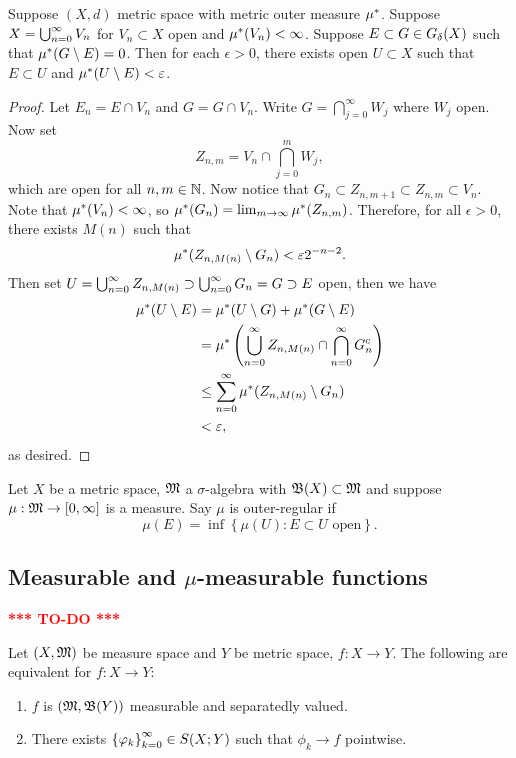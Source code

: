 \documentclass[a4paper]{article}
\begin{document}
\begin{lemma}
Suppose $(X, d)$ metric space with metric outer measure 
$\mu^*$. Suppose $X = \bigcup_{n=0}^\infty V_n$ for $V_n \subset X$ open and 
$\mu^*(V_n) < \infty$. Suppose $E \subset G \in G_\delta(X)$ such that 
$\mu^*(G \setminus E) = 0$. Then for each $\epsilon > 0$, 
there exists open $U \subset X$ such that $E \subset U$
and $\mu^*(U \setminus E) < \varepsilon$.  

\end{lemma}

\begin{proof}

Let $E_n = E \cap V_n$ and $G = G \cap V_n$. Write 
$G = \bigcap_{j=0}^\infty W_j$ where $W_j$ open. 
Now set 
\[
Z_{n, m} = V_n \cap \bigcap_{j=0}^m W_j,
\]
which are open for all $n, m \in \mathbb{N}$.
Now notice that $G_n \subset Z_{n, m+1} \subset Z_{n,m} 
\subset V_n$. Note that $\mu^*(V_n) < \infty$, so 
$\mu^*(G_n) = \lim_{m \to \infty} \mu^*(Z_{n, m})$. Therefore, 
for all $\epsilon > 0$, there exists $M(n)$ such that 
\[
\mu^*(Z_{n, M(n)} \setminus G_n) < \varepsilon 2^{-n-2}.
\]
Then set $U = \bigcup_{n=0}^\infty Z_{n, M(n)} \supset \bigcup_{n=0}^\infty G_n = G 
\supset E$ open, then we have 
\[
\begin{aligned}
\mu^*(U \setminus E) 
&= \mu^*(U \setminus G) + \mu^*(G \setminus E)  \\
&= \mu^* \left( \bigcup_{n=0}^\infty Z_{n, M(n)} \cap
\bigcap_{n=0}^\infty G_n^c \right) \\
&\leq \sum_{n=0}^\infty \mu^*(Z_{n, M(n)} \setminus G_n) \\
&< \varepsilon,
\end{aligned}
\]
as desired.

\end{proof}


\begin{defi}
  Let $X$ be a metric space, $\mathfrak{M}$ a $\sigma$-algebra
  with $\mathfrak{B}(X) \subset \mathfrak{M}$ and suppose $\mu: \mathfrak{M} \to [0, \infty]$
  is a measure. Say $\mu$ is outer-regular if 
  \[
  \mu(E) = \inf \left\{ \mu(U) : E \subset U \text{ open} \right\}.
  \]
\end{defi}


\subsection{Measurable and $\mu$-measurable functions}

\textcolor{red}{\textbf{*** TO-DO ***}}

\begin{thm}
  Let $(X, \mathfrak{M})$ be measure space and $Y$ be metric space, 
  $f : X \to Y$. The following are equivalent for 
  $f: X \to Y$: 
  \begin{enumerate}
    \item $f$ is $(\mathfrak{M}, \mathfrak{B}(Y))$ measurable and 
    separatedly valued.
    \item There exists $\left\{ \varphi_k \right\}_{k=0}^\infty \in S(X; Y)$
    such that $\phi_k \to f$ pointwise.
  \end{enumerate}
\end{thm}
\end{document}
